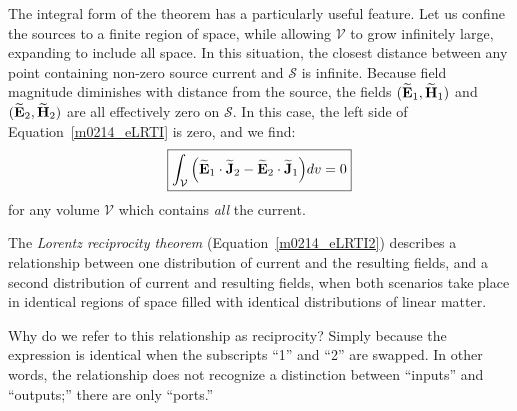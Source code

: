 The integral form of the theorem has a particularly useful feature.
Let us confine the sources to a finite region of space, while allowing $\mathcal{V}$ to grow infinitely large, expanding to include all space.
In this situation, the closest distance between any point containing non-zero source current and $\mathcal{S}$ is infinite.
Because field magnitude diminishes with distance from the source, the fields $(\widetilde{\bf E}_1,\widetilde{\bf H}_1)$ and $(\widetilde{\bf E}_2,\widetilde{\bf H}_2)$ are all effectively zero on $\mathcal{S}$.
In this case, the left side of Equation~\ref{m0214_eLRTI} is zero, and we find:
%
\begin{equation}
\boxed{
\int_{\mathcal V} {\left( \widetilde{\bf E}_1 \cdot \widetilde{\bf J}_2 
- \widetilde{\bf E}_2 \cdot \widetilde{\bf J}_1 \right)} dv = 0 
}
\label{m0214_eLRTI2}
\end{equation}
%
for any volume $\mathcal{V}$ which contains \emph{all} the current. 
%
\begin{mdframed}[backgroundcolor=yellow!20,nobreak=true] 
The \emph{Lorentz reciprocity theorem} (Equation~\ref{m0214_eLRTI2}) describes a relationship between one distribution of current and the resulting fields, and a second distribution of current and resulting fields, when both scenarios take place in identical regions of space filled with identical distributions of linear matter.
\end{mdframed}
%

Why do we refer to this relationship as reciprocity?
Simply because the expression is identical when the subscripts ``1'' and ``2'' are swapped.
In other words, the relationship does not recognize a distinction between ``inputs'' and ``outputs;'' there are only ``ports.''

